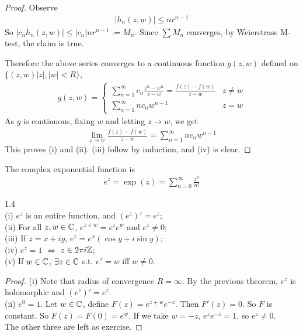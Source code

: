 \documentclass[a4paper]{article}
\begin{document}
\begin{thm}
\begin{proof}
Observe
\begin{equation*}
\begin{aligned}
|h_n(z,w)| \leq nr^{n-1}
\end{aligned}
\end{equation*}
So $|c_nh_n(z,w)| \leq |c_n| nr^{n-1} := M_n$. Since $\sum M_n$ converges, by Weierstrass M-test, the claim is true.

Therefore the above series converges to a continuous function $g(z,w)$ defined on $\{(z,w) |z|,|w|<R\}$,
\begin{equation*}
\begin{aligned}
g(z,w) = \left\{\begin{array}{ll}
\sum_{n=1}^\infty c_n \frac{z^n-w^n}{z-w} = \frac{f(z)-f(w)}{z-w} & z \neq w\\
\sum_{n=1}^\infty nc_nw^{n-1} & z = w
\end{array}\right.
\end{aligned}
\end{equation*}
As $g$ is continuous, fixing $w$ and letting $z \to w$, we get
\begin{equation*}
\begin{aligned}
\lim_{z \to w} \frac{f(z)-f(w)}{z-w} = \sum_{n=1}^\infty nc_n w^{n-1}
\end{aligned}
\end{equation*}
This proves (i) and (ii). (iii) follow by induction, and (iv) is clear.
\end{proof}
\end{thm}

\begin{defi}
The complex exponential function is
\begin{equation*}
\begin{aligned}
e^z = \exp(z) = \sum_{n=0}^\infty \frac{z^n}{n!}
\end{aligned}
\end{equation*}
\end{defi}

\begin{prop} 1.4\\
(i) $e^z$ is an entire function, and $(e^z)' = e^z$;\\
(ii) For all $z,w \in \mathbb{C}$, $e^{z+w} = e^z e^w$ and $e^z \neq 0$;\\
(iii) If $z=x+iy$, $e^z = e^x (\cos y + i\sin y)$;\\
(iv) $e^z = 1$ $\iff$ $z \in 2\pi i\mathbb{Z}$;\\
(v) If $w \in \mathbb{C}$, $\exists z \in \mathbb{C}$ s.t. $e^z = w$ iff $w \neq 0$.
\begin{proof}
(i) Note that radius of convergence $R = \infty$. By the previous theorem, $e^z$ is holomorphic and $(e^z)' =e^z$.\\
(ii) $e^0 = 1$. Let $w \in \mathbb{C}$, define $F(z) = e^{z+w} e^{-z}$. Then $F'(z) = 0$. So $F$ is constant. So $F(z) = F(0) = e^w$. If we take $w = -z$, $e^z e^{-z}=1$, so $e^z \neq 0$.\\
The other three are left as exercise.
\end{proof}
\end{prop}
\end{document}
